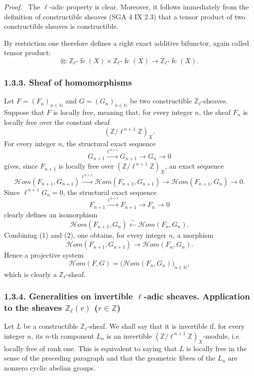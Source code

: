 \documentclass[11pt]{article}
\newenvironment{prooftext}[1][Proof]{\par\noindent\emph{#1.}\ }{\par\medskip}
\providecommand{\cHom}{\mathcal{H}om}
\providecommand{\fc}{\operatorname{fc}}
\begin{document}
\begin{prooftext}[Proof]
The \(\ell\)-adic property is clear. Moreover, it follows immediately from the definition of constructible sheaves (SGA 4 IX 2.3) that a tensor product of two constructible sheaves is constructible.
\end{prooftext}

By restriction one therefore defines a right exact additive bifunctor, again called tensor product:
\[
\otimes:\mathbb Z_\ell\text{-}\fc(X)\times \mathbb Z_\ell\text{-}\fc(X)
\longrightarrow \mathbb Z_\ell\text{-}\fc(X).
\]

\subsubsection*{1.3.3. Sheaf of homomorphisms}\label{sga5:VI:subsubsection:1.3.3}

Let \(F=(F_n)_{n\in\mathbb N}\) and \(G=(G_n)_{n\in\mathbb N}\) be two constructible \(\mathbb Z_\ell\)-sheaves. Suppose that \(F\) is locally free, meaning that, for every integer \(n\), the sheaf \(F_n\) is locally free over the constant sheaf
\[
(\mathbb Z/\ell^{\,n+1}\mathbb Z)_X.
\]
For every integer \(n\), the structural exact sequence
\[
G_{n+1}\xrightarrow{\ell^{\,n+1}}G_{n+1}\longrightarrow G_n\longrightarrow 0
\]
gives, since \(F_{n+1}\) is locally free over \((\mathbb Z/\ell^{\,n+1}\mathbb Z)_X\), an exact sequence
\[
\cHom(F_{n+1},G_{n+1})
 \xrightarrow{\ell^{\,n+1}}
\cHom(F_{n+1},G_{n+1})
 \longrightarrow
\cHom(F_{n+1},G_n)
 \longrightarrow 0.
\tag{1}\label{sga5:VI:equation:1}
\]
Since \(\ell^{\,n+1}G_n=0\), the structural exact sequence
\[
F_{n+1}\xrightarrow{\ell^{\,n+1}}F_{n+1}\longrightarrow F_n\longrightarrow 0
\]
clearly defines an isomorphism
\[
\cHom(F_{n+1},G_n)\xleftarrow{\sim}\cHom(F_n,G_n).
\tag{2}\label{sga5:VI:equation:2}
\]
Combining (1) and (2), one obtains, for every integer \(n\), a morphism
\[
\cHom(F_{n+1},G_{n+1})\longrightarrow \cHom(F_n,G_n).
\]
Hence a projective system
\[
\cHom(F,G)=\bigl(\cHom(F_n,G_n)\bigr)_{n\in\mathbb N},
\]
which is clearly a \(\mathbb Z_\ell\)-sheaf.

\subsubsection*{1.3.4. Generalities on invertible \(\ell\)-adic sheaves. Application to the sheaves \(\mathbb Z_\ell(r)\) (\(r\in\mathbb Z\))}\label{sga5:VI:subsubsection:1.3.4}

Let \(L\) be a constructible \(\mathbb Z_\ell\)-sheaf. We shall say that it is invertible if, for every integer \(n\), its \(n\)-th component \(L_n\) is an invertible \((\mathbb Z/\ell^{\,n+1}\mathbb Z)_X\)-module, i.e. locally free of rank one. This is equivalent to saying that \(L\) is locally free in the sense of the preceding paragraph and that the geometric fibres of the \(L_n\) are nonzero cyclic abelian groups.
\end{document}
